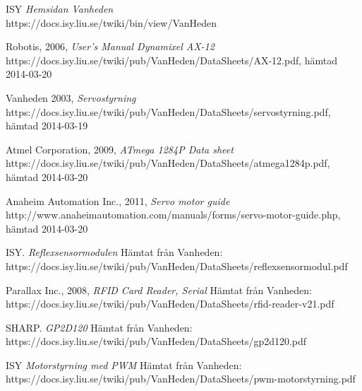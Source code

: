 \documentclass[a4paper,12pt]{article}
\begin{document}
\begin{thebibliography}{9}

 ISY \emph{Hemsidan Vanheden}
\\ https://docs.isy.liu.se/twiki/bin/view/VanHeden

 Robotis, 2006, \emph{User's Manual Dynamixel AX-12}
\\ https://docs.isy.liu.se/twiki/pub/VanHeden/DataSheets/AX-12.pdf, hämtad 2014-03-20

 Vanheden 2003, \emph{Servostyrning}
\\https://docs.isy.liu.se/twiki/pub/VanHeden/DataSheets/servostyrning.pdf, hämtad 2014-03-19

 Atmel Corporation, 2009, \emph{ATmega 1284P Data sheet}
\\https://docs.isy.liu.se/twiki/pub/VanHeden/DataSheets/atmega1284p.pdf, hämtad 2014-03-20

 Anaheim Automation Inc., 2011, \emph{Servo motor guide}
\\ http://www.anaheimautomation.com/manuals/forms/servo-motor-guide.php, hämtad 2014-03-20

 ISY.  \emph{Reflexsensormodulen} Hämtat från Vanheden: 
\\https://docs.isy.liu.se/twiki/pub/VanHeden/DataSheets/reflexsensormodul.pdf 

 Parallax Inc., 2008, \emph{RFID Card Reader, Serial} Hämtat från Vanheden: 
\\https://docs.isy.liu.se/twiki/pub/VanHeden/DataSheets/rfid-reader-v21.pdf

 SHARP. \emph{GP2D120} Hämtat från Vanheden: 
\\ https://docs.isy.liu.se/twiki/pub/VanHeden/DataSheets/gp2d120.pdf

 ISY \emph{Motorstyrning med PWM} Hämtat från Vanheden:
\\ https://docs.isy.liu.se/twiki/pub/VanHeden/DataSheets/pwm-motorstyrning.pdf



\end{thebibliography}

\newpage
\appendix


\end{document}
